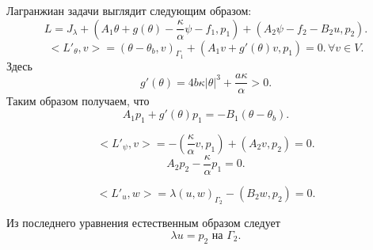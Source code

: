 Лагранжиан задачи выглядит следующим образом:
\begin{equation}
    \label{eq:lagrange}
    L = J_\lambda + (A_1 \theta+ g(\theta) - \frac{\kappa}{\alpha}\psi -f_1, p_1)
    + (A_2 \psi - f_2 - B_2 u, p_2).
\end{equation}
\begin{equation}
    \label{eq:lagrange_t}
    <L'_\theta, v> = (\theta - \theta_b, v)_{\Gamma_1}
    + (A_1 v + g'(\theta)v, p_1) = 0.\, \forall v \in V.
\end{equation}
Здесь
\[
    g'(\theta) = 4 b \kappa |\theta |^ 3 + \frac{a \kappa}{\alpha}  > 0.
\]
Таким образом получаем, что
\begin{equation}
    \label{eq:a1}
    A_1 p_1 + g'(\theta) p_1 = - B_1(\theta - \theta_b).
\end{equation}

\begin{equation}
    \label{eq:lagrange_p}
    <L'_\psi, v> = - ( \frac{\kappa}{\alpha} v, p_1) + (A_2v, p_2) = 0.
\end{equation}
\begin{equation}
    \label{eq:a2}
    A_2 p_2 - \frac{\kappa}{\alpha} p_1 = 0.
\end{equation}

\begin{equation}
    \label{eq:lagrange_u}
    <L'_u, w> = \lambda(u, w)_{\Gamma_2} - (B_2w, p_2) = 0.
\end{equation}

Из последнего уравнения естественным образом следует
\begin{equation}
    \label{eq:a3}
    \lambda u = p_2 \text{ на } \Gamma_2.
\end{equation}

